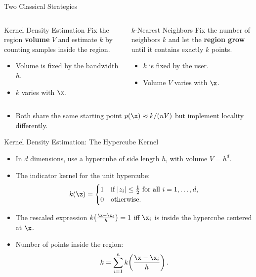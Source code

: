 \begin{frame}{Two Classical Strategies}
  \begin{columns}[t]
      \begin{block}{Kernel Density Estimation}
        Fix the region \textbf{volume} $V$ and estimate $k$ by counting samples inside the region.
        \begin{itemize}
          \item Volume is fixed by the bandwidth $h$.
          \item $k$ varies with $\x$.
        \end{itemize}
      \end{block}
      \begin{block}{$k$-Nearest Neighbors}
        Fix the number of neighbors $k$ and let the \textbf{region grow} until it contains exactly $k$ points.
        \begin{itemize}
          \item $k$ is fixed by the user.
          \item Volume $V$ varies with $\x$.
        \end{itemize}
      \end{block}
  \end{columns}
  \vspace{0.6em}
  \begin{itemize}
    \item Both share the same starting point $p(\x) \approx k/(nV)$ but implement locality differently.
  \end{itemize}
\end{frame}

\begin{frame}{Kernel Density Estimation: The Hypercube Kernel}
  \begin{itemize}
    \item In $d$ dimensions, use a hypercube of side length $h$, with volume $V = h^d$.
    \item The \alert{indicator kernel} for the unit hypercube:
    \[
      k(\z) = \begin{cases}
        1 & \text{if } |z_i| \le \tfrac{1}{2} \text{ for all } i=1,\ldots,d,\\
        0 & \text{otherwise.}
      \end{cases}
    \]
    \item The rescaled expression $k\!\left(\frac{\x - \x_i}{h}\right) = 1$ iff $\x_i$ is inside the hypercube centered at $\x$.
    \item Number of points inside the region:
    \[
      k = \sum_{i=1}^n k\!\left(\frac{\x-\x_i}{h}\right).
    \]
  \end{itemize}
\end{frame}

